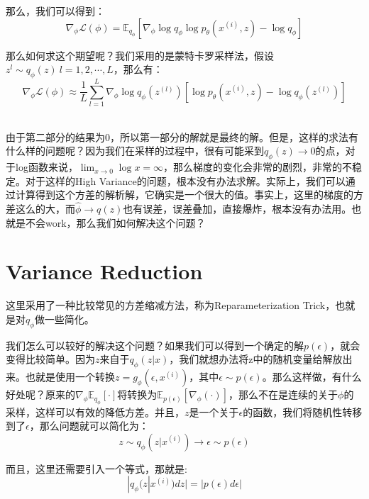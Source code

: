 \documentclass[a4paper]{article}
\begin{document}
那么，我们可以得到：
\begin{equation}
    \nabla_{\phi} \mathcal{L}(\phi) = \mathbb{E}_{q_{\phi}} \left[ \nabla_{\phi}\log q_{\phi} \log p_{\theta}(x^{(i)},z) - \log q_{\phi} \right] 
\end{equation}

那么如何求这个期望呢？我们采用的是蒙特卡罗采样法，假设$z^l \sim q_{\phi} (z)\ l = 1, 2, \cdots, L$，那么有：
\begin{equation}
    \nabla_{\phi} \mathcal{L}(\phi) \approx \frac{1}{L} \sum_{l=1}^L \nabla_{\phi}\log q_{\phi}(z^{(l)})\left[ \log p_{\theta}(x^{(i)},z) - \log q_{\phi}(z^{(l)})\right]
\end{equation}

~\\

由于第二部分的结果为0，所以第一部分的解就是最终的解。但是，这样的求法有什么样的问题呢？因为我们在采样的过程中，很有可能采到$q_{\phi}(z) \longrightarrow 0$的点，对于log函数来说，$\lim_{x\longrightarrow 0}\log x = \infty$，那么梯度的变化会非常的剧烈，非常的不稳定。对于这样的High Variance的问题，根本没有办法求解。实际上，我们可以通过计算得到这个方差的解析解，它确实是一个很大的值。事实上，这里的梯度的方差这么的大，而$\hat{\phi} \longrightarrow q(z)$也有误差，误差叠加，直接爆炸，根本没有办法用。也就是不会work，那么我们如何解决这个问题？

\section{Variance Reduction}
这里采用了一种比较常见的方差缩减方法，称为Reparameterization Trick，也就是对$q_{\phi}$做一些简化。

我们怎么可以较好的解决这个问题？如果我们可以得到一个确定的解$p(\epsilon)$，就会变得比较简单。因为$z$来自于$q_{\phi}(z|x)$，我们就想办法将z中的随机变量给解放出来。也就是使用一个转换$z = g_{\phi}(\epsilon, x^{(i)})$，其中$\epsilon \sim p(\epsilon)$。那么这样做，有什么好处呢？原来的$\nabla_{\phi} \mathbb{E}_{q_{\phi}}[\cdot]$将转换为$ \mathbb{E}_{p(\epsilon)}[\nabla_{\phi}(\cdot)]$，那么不在是连续的关于$\phi$的采样，这样可以有效的降低方差。并且，$z$是一个关于$\epsilon$的函数，我们将随机性转移到了$\epsilon$，那么问题就可以简化为：
\begin{equation}
    z \sim q_{\phi}(z|x^{(i)}) \longrightarrow \epsilon \sim p(\epsilon)
\end{equation}

而且，这里还需要引入一个等式，那就是:
\begin{equation}
    |q_{\phi}(z|x^{(i)})dz| = |p(\epsilon)d\epsilon|
\end{equation}
\end{document}
